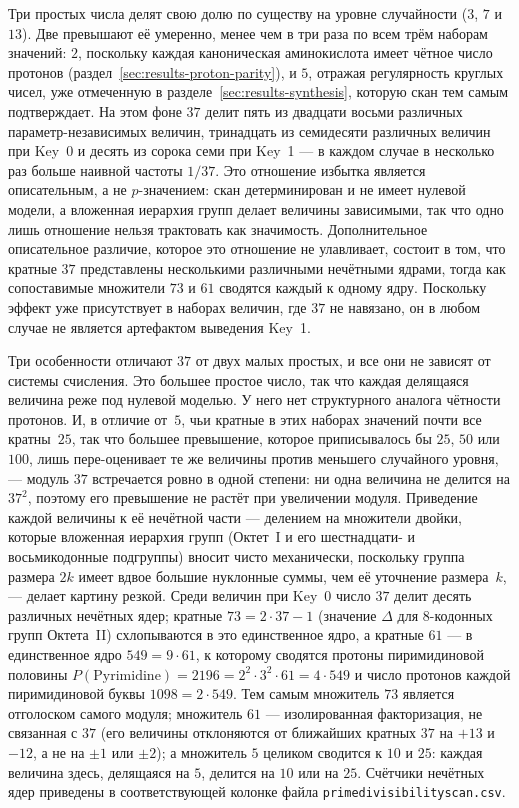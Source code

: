 \documentclass[11pt,a4paper]{article}
\renewcommand{\_}{\origunderscore\allowbreak}
\begin{document}
Три простых числа делят свою долю по существу на уровне
случайности ($3$, $7$ и $13$). Две превышают её умеренно, менее чем в три раза по всем трём наборам значений: $2$, поскольку каждая каноническая аминокислота имеет чётное число протонов (раздел~\ref{sec:results-proton-parity}), и
$5$, отражая регулярность круглых чисел, уже отмеченную в
разделе~\ref{sec:results-synthesis}, которую скан тем самым
подтверждает. На этом фоне $37$ делит пять из двадцати восьми различных
параметр-независимых величин, тринадцать из семидесяти различных
величин при Key~0 и десять из сорока семи при Key~1 — в каждом
случае в несколько раз больше наивной частоты $1/37$. Это
отношение избытка является описательным, а не $p$-значением:
скан детерминирован и не имеет нулевой модели, а вложенная
иерархия групп делает величины зависимыми, так что одно лишь
отношение нельзя трактовать как значимость. Дополнительное
описательное различие, которое это отношение не улавливает,
состоит в том, что кратные $37$ представлены несколькими
различными нечётными ядрами, тогда как сопоставимые множители
$73$ и $61$ сводятся каждый к одному ядру.
Поскольку эффект уже присутствует в наборах величин, где $37$ не
навязано, он в любом случае не является артефактом выведения
Key~1.

Три особенности отличают $37$ от двух малых простых, и все они не
зависят от системы счисления. Это большее простое число, так что
каждая делящаяся величина реже под нулевой моделью. У него нет
структурного аналога чётности протонов. И, в отличие от~$5$, чьи
кратные в этих наборах значений почти все кратны~$25$, так что
большее превышение, которое приписывалось бы $25$, $50$ или
$100$, лишь пере-оценивает те же величины против меньшего
случайного уровня, --- модуль $37$ встречается ровно в одной
степени: ни одна величина не делится на $37^2$, поэтому его
превышение не растёт при увеличении модуля. Приведение каждой величины к её
нечётной части --- делением на множители двойки, которые
вложенная иерархия групп (Октет~I и его шестнадцати- и
восьмикодонные подгруппы) вносит чисто механически, поскольку
группа размера $2k$ имеет вдвое большие нуклонные суммы, чем
её уточнение размера~$k$, --- делает картину резкой. Среди
величин при Key~0 число $37$ делит десять различных нечётных
ядер; кратные $73 = 2 \cdot 37 - 1$ (значение $\Delta$ для
$8$-кодонных групп Октета~II) схлопываются в это единственное
ядро, а кратные $61$ --- в единственное ядро $549 = 9 \cdot 61$,
к которому сводятся протоны пиримидиновой половины
$P(\mathrm{Pyrimidine}) = 2196 = 2^2 \cdot 3^2 \cdot 61 = 4 \cdot 549$
и число протонов каждой пиримидиновой буквы $1098 = 2 \cdot 549$. Тем самым множитель $73$ является отголоском самого
модуля; множитель $61$ --- изолированная факторизация, не
связанная с $37$ (его величины отклоняются от ближайших кратных
$37$ на $+13$ и $-12$, а не на $\pm1$ или $\pm2$); а множитель
$5$ целиком сводится к $10$ и $25$: каждая величина здесь,
делящаяся на $5$, делится на $10$ или на $25$. Счётчики нечётных
ядер приведены в соответствующей колонке файла
\texttt{prime\_divisibility\_scan.csv}.
\end{document}

